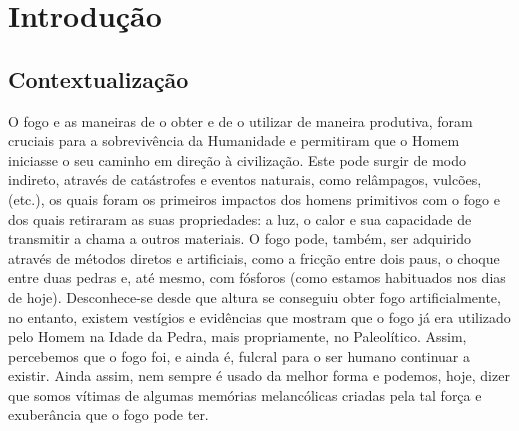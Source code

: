 \documentclass[a4paper,12pt]{scrreprt}
\newcommand{\tab}{
    \hspace{1cm}}
\begin{document}
\pagebreak



\renewcommand{\contentsname}{Índice}

\tableofcontents

\pagebreak

\listoffigures

\pagebreak

\listoftables

\pagebreak





\chapter{Introdução}
    \section{Contextualização}
        \tab O fogo e as maneiras de o obter e de o utilizar de maneira produtiva, foram cruciais para a sobrevivência da Humanidade e permitiram que o Homem iniciasse o  seu caminho em direção à civilização. Este pode surgir de modo indireto, através de catástrofes e eventos naturais, como relâmpagos, vulcões, (etc.), os quais foram os primeiros impactos dos homens primitivos com o fogo e dos quais retiraram as suas propriedades: a luz, o calor e sua capacidade de transmitir a chama a outros materiais. O fogo pode, também, ser adquirido através de métodos diretos e artificiais, como a fricção entre dois paus, o choque entre duas pedras e, até mesmo, com fósforos (como estamos habituados nos dias de hoje). Desconhece-se desde que altura se conseguiu obter fogo artificialmente, no entanto, existem vestígios e evidências que mostram que o fogo já era utilizado pelo Homem na Idade da Pedra, mais propriamente, no Paleolítico. Assim, percebemos que o fogo foi, e ainda é, fulcral para o ser humano continuar a existir. Ainda assim, nem sempre é usado da melhor forma e podemos, hoje, dizer que somos vítimas de algumas memórias melancólicas criadas pela tal força e exuberância que o fogo pode ter.
        
\end{document}
